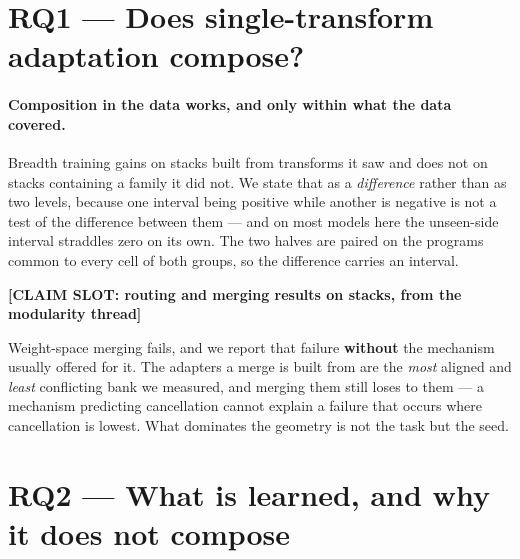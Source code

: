 \documentclass[sigconf,review,anonymous]{acmart}
\newcommand{\slot}[1]{\textbf{[CLAIM SLOT: #1]}}
\begin{document}
\section{RQ1 --- Does single-transform adaptation compose?}
\label{sec:rq1}

\paragraph{Composition in the data works, and only within what the data covered.} Breadth training
gains on stacks built from transforms it saw and does not on stacks containing a family it did not.
We state that as a \emph{difference} rather than as two levels, because one interval being positive
while another is negative is not a test of the difference between them --- and on most models here
the unseen-side interval straddles zero on its own. The two halves are paired on the programs common
to every cell of both groups, so the difference carries an interval.

\begin{table}[t]\centering\small
\caption{RQ1's dissociation, within model, on one program set. The \emph{difference} is the
measured quantity; the levels are context. StarCoder2 is the clearest case: both of its levels
straddle zero and its difference does not.}
\label{tab:dissoc}

\end{table}

\slot{routing and merging results on stacks, from the modularity thread}

Weight-space merging fails, and we report that failure \textbf{without} the mechanism usually
offered for it. The adapters a merge is built from are the \emph{most} aligned and \emph{least}
conflicting bank we measured, and merging them still loses to them --- a mechanism predicting
cancellation cannot explain a failure that occurs where cancellation is lowest. What dominates the
geometry is not the task but the seed.

\begin{table}[t]\centering\small
\caption{Task-vector geometry. Varying the \emph{seed} alone moves the update direction far more
than varying the \emph{condition} does.}
\label{tab:geom}

\end{table}

\section{RQ2 --- What is learned, and why it does not compose}
\label{sec:rq2}
\end{document}
